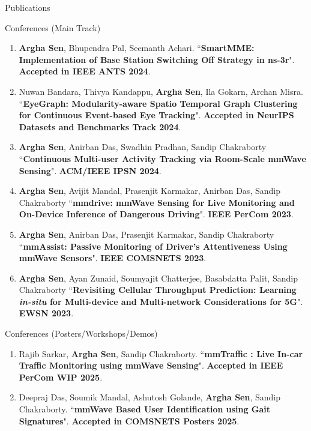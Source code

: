 \documentclass{resume} %
\begin{document}
\begin{rSection}{Publications}
\begin{rSubsection}{Conferences (Main Track)}{}{}{}
\begin{enumerate}
				\item \textbf{Argha Sen}, Bhupendra Pal, Seemanth Achari. 
				``\textbf{SmartMME: Implementation of Base Station Switching Off Strategy in ns-3r}". \textbf{Accepted in IEEE ANTS 2024}.
				
				\item Nuwan Bandara, Thivya Kandappu, \textbf{Argha Sen}, Ila Gokarn, Archan Misra.
				``\textbf{EyeGraph: Modularity-aware Spatio Temporal Graph Clustering for Continuous Event-based Eye Tracking}".
				\textbf{Accepted in NeurIPS Datasets and Benchmarks Track 2024}.
				
				\item \textbf{Argha Sen}, Anirban Das, Swadhin Pradhan, Sandip Chakraborty ``\textbf{Continuous Multi-user Activity Tracking via Room-Scale mmWave Sensing}". \textbf{ACM/IEEE IPSN 2024}.
				
				\item \textbf{Argha Sen}, Avijit Mandal, Prasenjit Karmakar, Anirban Das, Sandip Chakraborty ``\textbf{mmdrive: mmWave Sensing for Live Monitoring and On-Device Inference of Dangerous Driving}". \textbf{IEEE PerCom 2023}.
				
				\item \textbf{Argha Sen}, Anirban Das, Prasenjit Karmakar, Sandip Chakraborty ``\textbf{mmAssist: Passive Monitoring of Driver's Attentiveness Using mmWave Sensors}". \textbf{IEEE COMSNETS 2023}.
				
				\item \textbf{Argha Sen}, Ayan Zunaid, Soumyajit Chatterjee, Basabdatta Palit, Sandip Chakraborty ``\textbf{Revisiting Cellular Throughput Prediction: Learning \textit{in-situ} for Multi-device and Multi-network Considerations for 5G}". \textbf{EWSN 2023}.
				
			\end{enumerate}
			
		\end{rSubsection}{}{}{}{}		
		
		\begin{rSubsection}{Conferences (Posters/Workshops/Demos)}{}{}{}
			
			\begin{enumerate}
				\small
			\item Rajib Sarkar, \textbf{Argha Sen}, Sandip Chakraborty.	``\textbf{mmTraffic : Live In-car Traffic Monitoring using mmWave Sensing}". \textbf{Accepted in IEEE PerCom WIP 2025}.
			
			\item Deepraj Das, Soumik Mandal, Ashutosh Golande, \textbf{Argha Sen}, Sandip Chakraborty. 
			``\textbf{mmWave Based User Identification using Gait Signatures}". \textbf{Accepted in COMSNETS Posters 2025}.
			

\end{enumerate}
\end{rSubsection}
\end{rSection}
\end{document}

